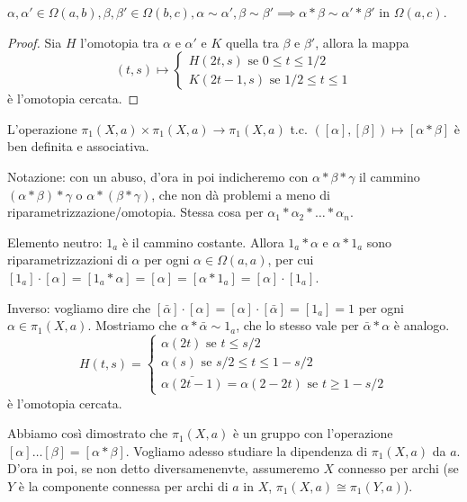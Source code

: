 \begin{lm}
  $\alpha, \alpha' \in \Omega(a, b), \beta, \beta' \in \Omega(b, c), \alpha \sim \alpha', \beta \sim \beta' \implies \alpha * \beta \sim \alpha' * \beta'$ in $\Omega(a, c)$.
\end{lm}

\begin{proof}
  Sia $H$ l'omotopia tra $\alpha$ e $\alpha'$ e $K$ quella tra $\beta$ e $\beta'$, allora la mappa
  $$(t, s) \mapsto \begin{cases} H(2t, s) \text{ se } 0 \le t \le 1/2 \\ K(2t-1, s) \text{ se } 1/2 \le t \le 1 \end{cases}$$ è l'omotopia cercata.
\end{proof}

\begin{cor}
  L'operazione $\pi_1(X, a) \times \pi_1(X, a) \rightarrow \pi_1(X, a)$ t.c. $([\alpha], [\beta]) \mapsto [\alpha * \beta]$ è ben definita e associativa.
\end{cor}

Notazione: con un abuso, d'ora in poi indicheremo con $\alpha * \beta * \gamma$ il cammino $(\alpha * \beta) * \gamma$ o $\alpha * (\beta * \gamma)$, che non dà problemi a meno di riparametrizzazione/omotopia. Stessa cosa per $\alpha_1 * \alpha_2 * \dots * \alpha_n$.

Elemento neutro: $1_a$ è il cammino costante. Allora $1_a * \alpha$ e $\alpha * 1_a$ sono riparametrizzazioni di $\alpha$ per ogni $\alpha \in \Omega(a, a)$, per cui $[1_a]\cdot[\alpha]=[1_a * \alpha]=[\alpha]=[\alpha * 1_a]=[\alpha]\cdot[1_a]$.

Inverso: vogliamo dire che $[\bar{\alpha}]\cdot[\alpha]=[\alpha]\cdot[\bar{\alpha}]=[1_a]=1$ per ogni $\alpha \in \pi_1(X, a)$. Mostriamo che $\alpha * \bar{\alpha} \sim 1_a$, che lo stesso vale per $\bar{\alpha} * \alpha$ è analogo.
$$H(t, s)=\begin{cases} \alpha(2t) \text{ se } t \le s/2 \\ \alpha(s) \text{ se } s/2 \le t \le 1-s/2 \\ \bar{\alpha(2t-1)}=\alpha(2-2t) \text{ se } t \ge 1-s/2 \end{cases}$$ è l'omotopia cercata.

Abbiamo così dimostrato che $\pi_1(X, a)$ è un gruppo con l'operazione $[\alpha]\dots[\beta]=[\alpha * \beta]$. Vogliamo adesso studiare la dipendenza di  $\pi_1(X, a)$ da $a$. D'ora in poi, se non detto diversamenenvte, assumeremo $X$ connesso per archi (se $Y$ è la componente connessa per archi di $a$ in $X$, $\pi_1(X,a ) \cong \pi_1(Y, a)$).

